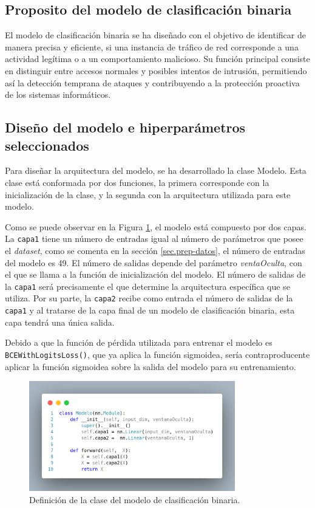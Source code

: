 
\subsection{Proposito del modelo de clasificación binaria}
El modelo de clasificación binaria se ha diseñado con el objetivo de identificar de manera precisa y eficiente, si una instancia de tráfico de red corresponde a una actividad legítima o a un comportamiento malicioso. Su función principal consiste en distinguir entre accesos normales y posibles intentos de intrusión, permitiendo así la detección temprana de ataques y contribuyendo a la protección proactiva de los sistemas informáticos.

\subsection{Diseño del modelo e hiperparámetros seleccionados} \label{sec:disBIN}
Para diseñar la arquitectura del modelo, se ha desarrollado la clase Modelo. Esta clase está conformada por dos funciones, la primera corresponde con la inicialización de la clase, y la segunda con la arquitectura utilizada para este modelo.

Como se puede observar en la Figura \ref{fig:modBIN}, el modelo está compuesto por dos capas. La \texttt{capa1} tiene un número de entradas igual al número de parámetros que posee el \textit{dataset}, como se comenta en la sección \ref{sec.prep-datos}, el número de entradas del modelo es 49. El número de salidas depende del parámetro \textit{ventaOculta}, con el que se llama a la función de inicialización del modelo. El número de salidas de la \texttt{capa1} será precisamente el que determine la arquitectura específica que se utiliza. Por su parte, la \texttt{capa2} recibe como entrada el número de salidas de la \texttt{capa1} y al tratarse de la capa final de un modelo de clasificación binaria, esta capa tendrá una única salida.

Debido a que la función de pérdida utilizada para entrenar el modelo es \texttt{BCEWithLogitsLoss()}, que ya aplica la función sigmoidea, sería contraproducente aplicar la función sigmoidea sobre la salida del modelo para su entrenamiento.

\begin{figure}[H]
    \centering
    \includegraphics[width=0.8\textwidth]{./img/modelo/codigo/modeloBIN.png}
    \caption{Definición de la clase del modelo de clasificación binaria.}
    \label{fig:modBIN}
\end{figure}


